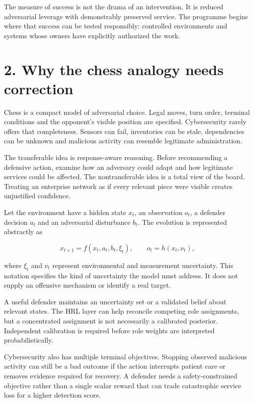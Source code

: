 \documentclass[11pt]{article}
\begin{document}
The measure of success is not the drama of an intervention. It is reduced adversarial leverage with demonstrably preserved service. The programme begins where that success can be tested responsibly: controlled environments and systems whose owners have explicitly authorized the work.

\clearpage
\section*{2. Why the chess analogy needs correction}
Chess is a compact model of adversarial choice. Legal moves, turn order, terminal conditions and the opponent's visible position are specified. Cybersecurity rarely offers that completeness. Sensors can fail, inventories can be stale, dependencies can be unknown and malicious activity can resemble legitimate administration.

The transferable idea is response-aware reasoning. Before recommending a defensive action, examine how an adversary could adapt and how legitimate services could be affected. The nontransferable idea is a total view of the board. Treating an enterprise network as if every relevant piece were visible creates unjustified confidence.

Let the environment have a hidden state $x_t$, an observation $o_t$, a defender decision $a_t$ and an adversarial disturbance $b_t$. The evolution is represented abstractly as

\[
x_{t+1}=f(x_t,a_t,b_t,\xi_t),\qquad o_t=h(x_t,\nu_t),
\]

where $\xi_t$ and $\nu_t$ represent environmental and measurement uncertainty. This notation specifies the kind of uncertainty the model must address. It does not supply an offensive mechanism or identify a real target.

A useful defender maintains an uncertainty set or a validated belief about relevant states. The HRL layer can help reconcile competing role assignments, but a concentrated assignment is not necessarily a calibrated posterior. Independent calibration is required before role weights are interpreted probabilistically.

Cybersecurity also has multiple terminal objectives. Stopping observed malicious activity can still be a bad outcome if the action interrupts patient care or removes evidence required for recovery. A defender needs a safety-constrained objective rather than a single scalar reward that can trade catastrophic service loss for a higher detection score.
\end{document}
